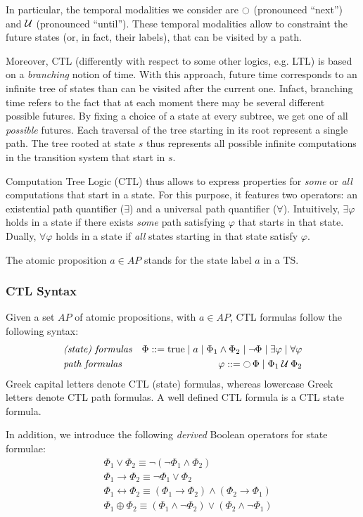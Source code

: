 \documentclass{article}
\begin{document}
In particular, the temporal modalities we consider are $\ocircle$ (pronounced ``next'') and $\mathbin{\mathcal{U}}$ (pronounced ``until'').
These temporal modalities allow to constraint the future states (or, in fact, their labels), that can be visited by a path.

Moreover, CTL (differently with respect to some other logics, e.g. LTL) is based on a \emph{branching} notion of time. With this approach, future time corresponds to an infinite tree of states than can be visited after the current one. Infact, branching time refers to the fact that at each moment there may be several different possible futures. By fixing a choice of a state at every subtree, we get one of all \emph{possible} futures. 
Each traversal of the tree starting in its root represent a single path. The tree rooted at state $s$ thus represents all possible infinite computations in the transition system that start in $s$.

Computation Tree Logic (CTL) thus allows to express properties for \emph{some} or \emph{all} computations that start in a state. For this purpose, it features two operators: an existential path quantifier ($\exists$) and a universal path quantifier ($\forall$). Intuitively, $\exists \varphi$ holds in a state if there exists \emph{some} path satisfying $\varphi$ that starts in that state. Dually, $\forall \varphi$ holds in a state if \emph{all} states starting in that state satisfy $\varphi$.

The atomic proposition $a \in AP$ stands for the state label $a$ in a TS.

\subsubsection*{CTL Syntax}
Given a set $AP$ of atomic propositions, with $a \in AP$, CTL formulas follow the following syntax: 
\begin{align*}
    & \emph{(state) formulas} & \Phi ::= \text{true} \mid a \mid \Phi_1 \land \Phi_2 \mid \neg \Phi \mid \exists \varphi \mid \forall \varphi \\
    & \emph{path formulas}    & \varphi ::= \mathop{\ocircle}{\Phi} \mid \Phi_1 \mathbin{\mathcal{U}} \Phi_2
\end{align*}
Greek capital letters denote CTL (state) formulas, whereas lowercase Greek letters denote CTL path formulas. 
A well defined CTL formula is a CTL state formula.

In addition, we introduce the following \emph{derived} Boolean operators for state formulae: 
\begin{align*}
    &\; \Phi_1 \lor \Phi_2 \equiv \neg (\neg \Phi_1 \land \Phi_2) \\
    &\; \Phi_1 \rightarrow \Phi_2 \equiv \neg \Phi_1 \lor \Phi_2 \\
    &\; \Phi_1 \leftrightarrow  \Phi_2 \equiv (\Phi_1 \rightarrow \Phi_2) \land (\Phi_2 \rightarrow \Phi_1) \\
    &\; \Phi_1 \oplus  \Phi_2 \equiv (\Phi_1 \land \neg \Phi_2) \lor (\Phi_2 \land \neg \Phi_1)\\
\end{align*}
\end{document}
